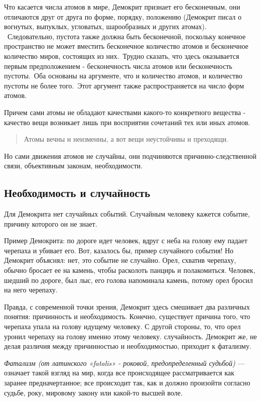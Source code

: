 \documentclass[a4paper, 14pt]{extreport}
\begin{document}
Что касается числа атомов в мире, Демокрит признает его бесконечным, они
отличаются друг от друга по форме, порядку, положению (Демокрит писал о
вогнутых, выпуклых, угловатых, шарообразных и других атомах).
~Следовательно, пустота также должна быть бесконечной, поскольку
конечное пространство не может вместить бесконечное количество атомов и
бесконечное количество миров, состоящих из них.~Трудно сказать, что
здесь оказывается первым предположением - бесконечность числа атомов или
бесконечность пустоты.~Оба основаны на аргументе, что и количество
атомов, и количество пустоты не более того.~Этот аргумент также
распространяется на число форм атомов.

Причем сами атомы не обладают качествами какого-то конкретного вещества
- качество вещи возникает лишь при восприятии сочетаний тех или иных
атомов.

\begin{quote}
Атомы вечны и неизменны, а вот вещи неустойчивы и преходящи.
\end{quote}

Но сами движения атомов не случайны, они подчиняются
причинно-следственной связи, объективным законам, необходимости.

\subsection{Необходимость и случайность}

Для Демокрита нет случайных событий. Случайным человеку кажется событие,
причину которого он не знает.

Пример Демокрита: по дороге идет человек, вдруг с неба на голову ему
падает черепаха и убивает его. Вот, казалось бы, пример случайного
события! Но Демокрит объяснял: нет, это событие не случайно. Орел,
схватив черепаху, обычно бросает ее на камень, чтобы расколоть панцирь и
полакомиться. Человек, шедший по дороге, был лыс, его голова напоминала
камень, потому орел бросил на него черепаху.

Правда, с современной точки зрения, Демокрит здесь смешивает два
различных понятия: причинность и необходимость. Конечно, существует
причина того, что черепаха упала на голову идущему человеку. С другой
стороны, то, что орел уронил черепаху на голову именно этому человеку.
случайность. Демокрит же, не делая различия между причинностью и
необходимостью, приходит к фатализму.

\emph{Фатализм (от латинского «fatalis» - роковой,
предопределенный судьбой)} ---
означает такой взгляд на мир, когда все происходящее рассматривается как
заранее предначертанное; все происходит так, как и должно произойти
согласно судьбе, року, мировому закону или какой-то высшей воле.
\end{document}

